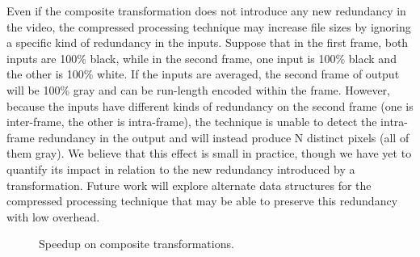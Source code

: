 Even if the composite transformation does not introduce any new
redundancy in the video, the compressed processing technique may
increase file sizes by ignoring a specific kind of redundancy in the
inputs.  Suppose that in the first frame, both inputs are 100\% black,
while in the second frame, one input is 100\% black and the other is
100\% white.  If the inputs are averaged, the second frame of output
will be 100\% gray and can be run-length encoded within the frame.
However, because the inputs have different kinds of redundancy on the
second frame (one is inter-frame, the other is intra-frame), the
technique is unable to detect the intra-frame redundancy in the output
and will instead produce N distinct pixels (all of them gray).  We
believe that this effect is small in practice, though we have yet to
quantify its impact in relation to the new redundancy introduced by a
transformation.  Future work will explore alternate data structures
for the compressed processing technique that may be able to preserve
this redundancy with low overhead.

\begin{figure}[t]
\caption{Speedup on composite transformations.
\protect\label{fig:composite-speedup}}
\end{figure}
